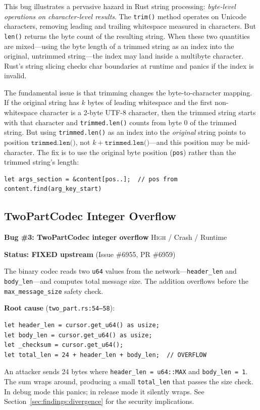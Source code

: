 %
This bug illustrates a pervasive hazard in Rust string processing: \emph{byte-level operations on character-level results}. The \texttt{trim()} method operates on Unicode characters, removing leading and trailing whitespace measured in characters. But \texttt{len()} returns the byte count of the resulting string. When these two quantities are mixed---using the byte length of a trimmed string as an index into the original, untrimmed string---the index may land inside a multibyte character. Rust's string slicing checks char boundaries at runtime and panics if the index is invalid.

The fundamental issue is that trimming changes the byte-to-character mapping. If the original string has $k$ bytes of leading whitespace and the first non-whitespace character is a 2-byte UTF-8 character, then the trimmed string starts with that character and \texttt{trimmed.len()} counts from byte 0 of the trimmed string. But using \texttt{trimmed.len()} as an index into the \emph{original} string points to position $\texttt{trimmed.len()}$, not $k + \texttt{trimmed.len()}$---and this position may be mid-character. The fix is to use the original byte position (\texttt{pos}) rather than the trimmed string's length:

\begin{verbatim}
let args_section = &content[pos..];  // pos from content.find(arg_key_start)
\end{verbatim}

\subsection{TwoPartCodec Integer Overflow}

\begin{bugbox}
\textbf{Bug \#3: TwoPartCodec integer overflow} \hfill \textsc{High} / Crash / Runtime

\textbf{Status: FIXED upstream} (Issue \#6955, PR \#6959)

\medskip
The binary codec reads two \texttt{u64} values from the network---\texttt{header\_len} and \texttt{body\_len}---and computes total message size. The addition overflows before the \texttt{max\_message\_size} safety check.

\medskip
\textbf{Root cause} (\texttt{two\_part.rs:54--58}):
\begin{verbatim}
let header_len = cursor.get_u64() as usize;
let body_len = cursor.get_u64() as usize;
let _checksum = cursor.get_u64();
let total_len = 24 + header_len + body_len;  // OVERFLOW
\end{verbatim}

An attacker sends 24 bytes where \texttt{header\_len = u64::MAX} and \texttt{body\_len = 1}. The sum wraps around, producing a small \texttt{total\_len} that passes the size check. In debug mode this panics; in release mode it silently wraps. See Section~\ref{sec:findings:divergence} for the security implications.
\end{bugbox}

